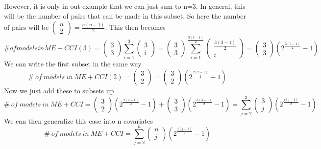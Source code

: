 However, it is only in out example that we can just sum to n=3. In general, this will be the number of pairs that can be made in this subset. So here the number of pairs will be $\left( \begin{array}{c}
n \\ 
2 \end{array}
\right)=\frac{n\left(n-1\right)}{2}$. This then becomes
\[\#of models in ME+CCI(3)=\left( \begin{array}{c}
3 \\ 
3 \end{array}
\right)\sum^3_{i=1}{\left( \begin{array}{c}
3 \\ 
i \end{array}
\right)}=\left( \begin{array}{c}
3 \\ 
3 \end{array}
\right)\sum^{\frac{3\left(3-1\right)}{2}}_{i=1}{\left( \begin{array}{c}
\frac{3\left(3-1\right)}{2} \\ 
i \end{array}
\right)}=\left( \begin{array}{c}
3 \\ 
3 \end{array}
\right)\left(2^{\frac{3\left(3-1\right)}{2}}-1\right)\] 
We can write the first subset in the same way
\[\#\ of\ models\ in\ ME+CCI(2)=\left( \begin{array}{c}
3 \\ 
2 \end{array}
\right)=\left( \begin{array}{c}
3 \\ 
2 \end{array}
\right)\left(2^{\frac{2\left(2-1\right)}{2}}-1\right)\] 
Now we just add these to subsets up
\[\#\ of\ models\ in\ ME+CCI=\left( \begin{array}{c}
3 \\ 
2 \end{array}
\right)\left(2^{\frac{2\left(2-1\right)}{2}}-1\right)+\left( \begin{array}{c}
3 \\ 
3 \end{array}
\right)\left(2^{\frac{3\left(3-1\right)}{2}}-1\right)=\sum^3_{j=2}{\left( \begin{array}{c}
3 \\ 
j \end{array}
\right)\left(2^{\frac{j\left(j-1\right)}{2}}-1\right)}\] 
We can then generalize this case into n covariates
\[\#\ of\ models\ in\ ME+CCI=\sum^n_{j=2}{\left( \begin{array}{c}
n \\ 
j \end{array}
\right)\left(2^{\frac{j\left(j-1\right)}{2}}-1\right)}\] 

